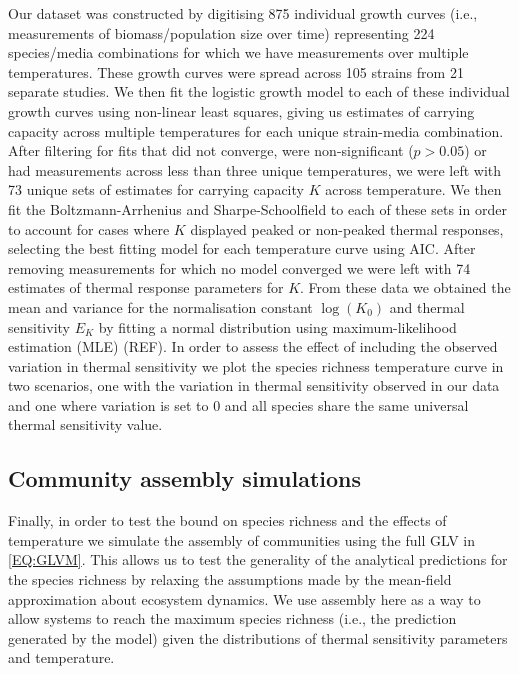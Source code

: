 \documentclass{article}
\begin{document}
Our dataset was constructed by digitising 875 individual growth curves (i.e., measurements of biomass/population size over time) representing 224 species/media combinations for which we have measurements over multiple temperatures. These growth curves were spread across 105 strains from 21 separate studies. We then fit the logistic growth model to each of these individual growth curves using non-linear least squares, giving us estimates of carrying capacity across multiple temperatures for each unique strain-media combination. After filtering for fits that did not converge, were non-significant ($p > 0.05$) or had measurements across less than three unique temperatures, we were left with 73 unique sets of estimates for carrying capacity $K$ across temperature. We then fit the Boltzmann-Arrhenius and Sharpe-Schoolfield \citep{Schoolfield1981} to each of these sets in order to account for cases where $K$ displayed peaked or non-peaked thermal responses, selecting the best fitting model for each temperature curve using AIC. After removing measurements for which no model converged we were left with 74 estimates of thermal response parameters for $K$. From these data we obtained the mean and variance for the normalisation constant $\log(K_0)$ and thermal sensitivity $E_K$ by fitting a normal distribution using maximum-likelihood estimation (MLE) (REF). In order to assess the effect of including the observed variation in thermal sensitivity we plot the species richness temperature curve in two scenarios, one with the variation in thermal sensitivity observed in our data and one where variation is set to $0$ and all species share the same universal thermal sensitivity value. 

\subsection*{Community assembly simulations}

Finally, in order to test the bound on species richness and the effects of temperature we simulate the assembly of communities using the full GLV in \cref{EQ:GLVM}. This allows us to test the generality of the analytical predictions for the species richness by relaxing the assumptions made by the mean-field approximation about ecosystem dynamics. We use assembly here as a way to allow systems to reach the maximum species richness (i.e., the prediction generated by the model) given the distributions of thermal sensitivity parameters and temperature. 
\end{document}
